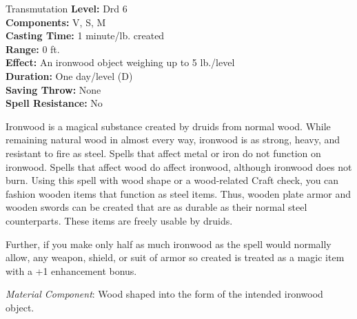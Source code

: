 {Transmutation}
{
	\textbf{Level:}
	Drd 6\\
	\textbf{Components:}
	V, S, M\\
	\textbf{Casting Time:}
	1 minute/lb. created\\
	\textbf{Range:}
	0 ft.\\
	\textbf{Effect:}
	An ironwood object weighing up to 5 lb./level\\
	\textbf{Duration:}
	One day/level (D)\\
	\textbf{Saving Throw:}
	None\\
	\textbf{Spell Resistance:}
	No\\
}
{
	Ironwood is a magical substance created by druids from normal wood. While remaining natural wood in almost every way, ironwood is as strong, heavy, and resistant to fire as steel. Spells that affect metal or iron do not function on ironwood. Spells that affect wood do affect ironwood, although ironwood does not burn. Using this spell with wood shape or a wood-related Craft check, you can fashion wooden items that function as steel items. Thus, wooden plate armor and wooden swords can be created that are as durable as their normal steel counterparts. These items are freely usable by druids.

	Further, if you make only half as much ironwood as the spell would normally allow, any weapon, shield, or suit of armor so created is treated as a magic item with a +1 enhancement bonus.

	\textit{Material Component}:
	Wood shaped into the form of the intended ironwood object.

}
